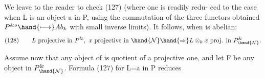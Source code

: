 We leave to the reader to check (127) (where one is readily redu-%
ced to the case when L is an object a in P, using the 
commutation of the three functors obtained $P^{\& o} \hand{\longmapsto} Ab_k$ with small
inverse limits).  It follows, when  is abelian:
\[ (128) \qquad L \text{ projective in } P^{\&} , \ x \text{ projective in } \hand{\mathcal{N}} \hand{\Rightarrow} L\otimes_k x \text{ proj. in } P^{\&}_{\hand{\mathcal{N}}} . \]

Assume now that any object of  is quotient of a projective one,
and let F be any object in $P^{\&}_{\hand{\mathcal{N}}}$. Formula (127) for L=a in P reduces

